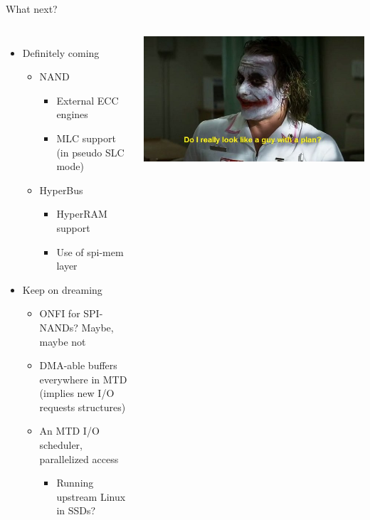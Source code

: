 \documentclass[aspectratio=169,obeyspaces,spaces,hyphens,dvipsnames]{beamer}
\begin{document}
\begin{frame}{What next?}
  \begin{columns}
    \begin{itemize}
    \item Definitely coming
      \begin{itemize}
      \item NAND
        \begin{itemize}
        \item External ECC engines
        \item MLC support (in pseudo SLC mode)
        \end{itemize}
      \item HyperBus
        \begin{itemize}
        \item HyperRAM support
        \item Use of spi-mem layer
        \end{itemize}
      \end{itemize}
      \vfill
    \item Keep on dreaming
      \begin{itemize}
      \item ONFI for SPI-NANDs? Maybe, maybe not
      \item DMA-able buffers everywhere in MTD\\ (implies new I/O requests
        structures)
      \item An MTD I/O scheduler, parallelized access
        \begin{itemize}
        \item Running upstream Linux in SSDs?
        \end{itemize}
      \end{itemize}
    \end{itemize}
    \begin{center}
      \includegraphics[scale=0.30]{plan.jpg}
    \end{center}
  \end{columns}
\end{frame}
\end{document}
